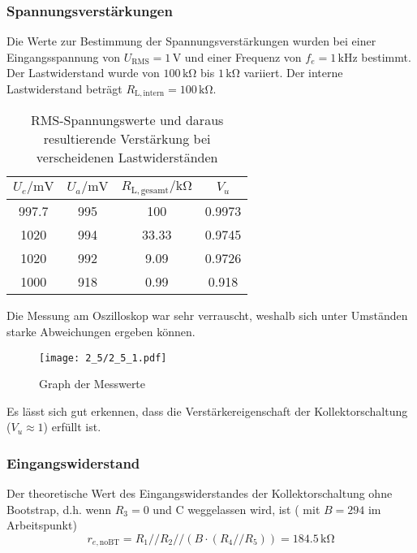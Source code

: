 \subsubsection{Spannungsverstärkungen}
Die Werte zur Bestimmung der Spannungsverstärkungen wurden bei einer
Eingangsspannung von $U_{\mathrm{RMS}} = 1 \, \si{\volt}$ und einer
Frequenz von $f_e = 1 \, \si{\kilo\hertz}$ bestimmt. Der Lastwiderstand wurde
von $100 \, \si{\kilo\ohm}$ bis $1 \, \si{\kilo\ohm}$ variiert. Der interne Lastwiderstand beträgt $R_{\mathrm{L,intern}} =
100 \, \si{\kilo\ohm}$.


\begin{table}[H]
  \begin{center}
    \begin{tabular}{|c|c|c|c|}
      \hline
      $U_e / \si{\milli\volt}$ & $U_a / \si{\milli\volt}$ & $R_{\mathrm{L,gesamt}} / \si{\kilo\ohm}$ & $V_u$\\
      \hline
      \hline
      997.7 & 995 & 100 & 0.9973\\
      1020 & 994 & 33.33 & 0.9745\\
      1020 & 992 & 9.09 & 0.9726\\
      1000 & 918 & 0.99 & 0.918\\
      \hline
    \end{tabular}
  \end{center}
  \caption{RMS-Spannungswerte und daraus resultierende Verstärkung bei
    verscheidenen Lastwiderständen}
\end{table}

Die Messung am Oszilloskop war sehr verrauscht, weshalb sich unter Umständen
starke Abweichungen ergeben können.

\begin{figure}[H]
  \begin{center}
    \texttt{[image: 2\_5/2\_5\_1.pdf]}
  \end{center}
  \caption{Graph der Messwerte}
\end{figure}

Es lässt sich gut erkennen, dass die Verstärkereigenschaft der
Kollektorschaltung ($V_u \approx 1$) erfüllt ist.

\subsubsection{Eingangswiderstand}
Der theoretische Wert des Eingangswiderstandes der Kollektorschaltung ohne
Bootstrap, d.h. wenn $R_3 = 0$ und C weggelassen wird,  ist ( mit $B = 294$ im Arbeitspunkt)
\[r_{e,\mathrm{noBT}} = R_1 // R_2 // (B \cdot (R_4 // R_5)) = 184.5 \,\si{\kilo\ohm}\]

